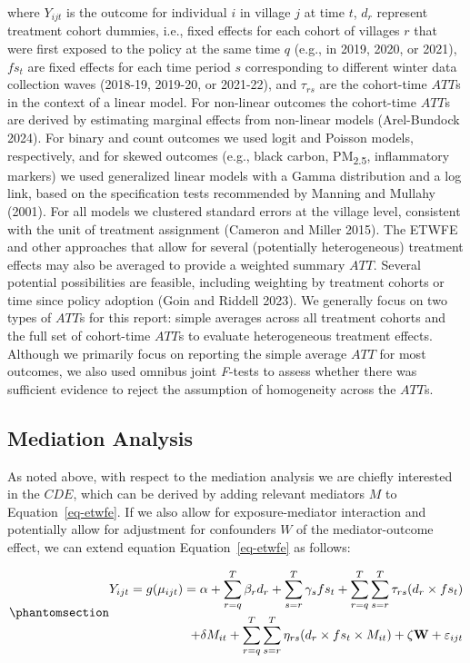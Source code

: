 \documentclass[
  letterpaper,
  DIV=11,
  numbers=noendperiod]{scrartcl}
\begin{document}
where \(Y_{ijt}\) is the outcome for individual \(i\) in village \(j\)
at time \(t\), \(d_{r}\) represent treatment cohort dummies, i.e., fixed
effects for each cohort of villages \(r\) that were first exposed to the
policy at the same time \(q\) (e.g., in 2019, 2020, or 2021), \(fs_{t}\)
are fixed effects for each time period \(s\) corresponding to different
winter data collection waves (2018-19, 2019-20, or 2021-22), and
\(\tau_{rs}\) are the cohort-time \(ATT\)s in the context of a linear
model. For non-linear outcomes the cohort-time \(ATT\)s are derived by
estimating marginal effects from non-linear models (Arel-Bundock 2024).
For binary and count outcomes we used logit and Poisson models,
respectively, and for skewed outcomes (e.g., black carbon,
PM\textsubscript{2.5}, inflammatory markers) we used generalized linear
models with a Gamma distribution and a log link, based on the
specification tests recommended by Manning and Mullahy (2001). For all
models we clustered standard errors at the village level, consistent
with the unit of treatment assignment (Cameron and Miller 2015). The
ETWFE and other approaches that allow for several (potentially
heterogeneous) treatment effects may also be averaged to provide a
weighted summary \(ATT\). Several potential possibilities are feasible,
including weighting by treatment cohorts or time since policy adoption
(Goin and Riddell 2023). We generally focus on two types of \(ATT\)s for
this report: simple averages across all treatment cohorts and the full
set of cohort-time \(ATT\)s to evaluate heterogeneous treatment effects.
Although we primarily focus on reporting the simple average \(ATT\) for
most outcomes, we also used omnibus joint \emph{F}-tests to assess
whether there was sufficient evidence to reject the assumption of
homogeneity across the \(ATT\)s.

\subsection{Mediation Analysis}\label{mediation-analysis}

As noted above, with respect to the mediation analysis we are chiefly
interested in the \(CDE\), which can be derived by adding relevant
mediators \(M\) to Equation~\ref{eq-etwfe}. If we also allow for
exposure-mediator interaction and potentially allow for adjustment for
confounders \(W\) of the mediator-outcome effect, we can extend equation
Equation~\ref{eq-etwfe} as follows:

\begin{equation}\phantomsection\label{eq-etwfem}{
\begin{aligned}
Y_{ijt}=g(\mu_{ijt}) = \alpha + \sum_{r=q}^{T} \beta_{r} d_{r} + \sum_{s=r}^{T} \gamma_{s} fs_{t}+ \sum_{r=q}^{T} \sum_{s=r}^{T} \tau_{rs} (d_{r} \times fs_{t}) \\ + \delta M_{it} + \sum_{r=q}^{T} \sum_{s=r}^{T} \eta_{rs} (d_{r} \times fs_{t} \times M_{it}) + \zeta \mathbf{W} + \varepsilon_{ijt}
\end{aligned}
}\end{equation}
\end{document}

